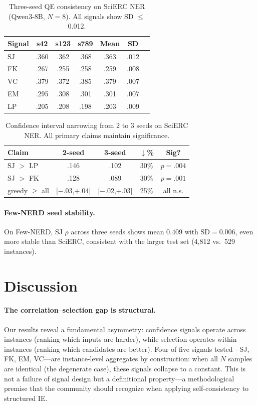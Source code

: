 \documentclass[11pt,twocolumn]{article}
\begin{document}
\begin{table}[t]
\centering
\small
\caption{Three-seed QE consistency on SciERC NER (Qwen3-8B, $N{=}8$). All signals show SD $\leq$ 0.012.}
\label{tab:3seed}
\begin{tabular}{@{}l cccccc@{}}
\toprule
Signal & s42 & s123 & s789 & Mean & SD \\
\midrule
SJ  & .360 & .362 & .368 & .363 & .012 \\
FK  & .267 & .255 & .258 & .259 & .008 \\
VC  & .379 & .372 & .385 & .379 & .007 \\
EM  & .295 & .308 & .301 & .301 & .007 \\
LP  & .205 & .208 & .198 & .203 & .009 \\
\bottomrule
\end{tabular}
\end{table}

\begin{table}[t]
\centering
\small
\caption{Confidence interval narrowing from 2 to 3 seeds on SciERC NER. All primary claims maintain significance.}
\label{tab:ci}
\begin{tabular}{@{}l cccc@{}}
\toprule
Claim & 2-seed & 3-seed & $\downarrow$\% & Sig? \\
\midrule
SJ $>$ LP  & .146 & .102 & 30\% & $p{=}.004$ \\
SJ $>$ FK  & .128 & .089 & 30\% & $p{=}.001$ \\
greedy $\geq$ all & [${-}$.03,${+}$.04] & [${-}$.02,${+}$.03] & 25\% & all n.s. \\
\bottomrule
\end{tabular}
\end{table}

\paragraph{Few-NERD seed stability.}
On Few-NERD, SJ $\rho$ across three seeds shows mean 0.409 with SD${=}0.006$, even more stable than SciERC, consistent with the larger test set (4,812 vs.\ 529 instances).

\section{Discussion}
\label{sec:discussion}

\paragraph{The correlation--selection gap is structural.}
Our results reveal a fundamental asymmetry: confidence signals operate across instances (ranking which inputs are harder), while selection operates within instances (ranking which candidates are better).
Four of five signals tested---SJ, FK, EM, VC---are instance-level aggregates by construction: when all $N$ samples are identical (the degenerate case), these signals collapse to a constant.
This is not a failure of signal design but a definitional property---a methodological premise that the community should recognize when applying self-consistency to structured IE.
\end{document}

